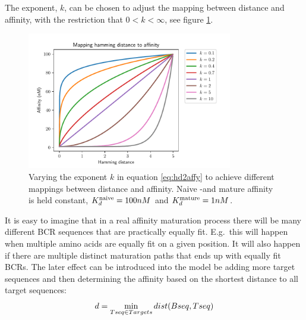 The exponent, $k$, can be chosen to adjust the mapping between distance and affinity, with the restriction that $0 < k < \infty$, see figure \ref{fig:hd2affy}.
\begin{figure}
    \centering
    \includegraphics[width=0.8\textwidth]{figures/hd2affy.pdf}
    \caption{
        \label{fig:hd2affy}
        Varying the exponent $k$ in equation \ref{eq:hd2affy} to achieve different mappings between distance and affinity. Naive -and mature affinity is held constant, $K^{\text{naive}}_d = 100nM$ and $K^{\text{mature}}_d = 1nM$.
    }
\end{figure}

It is easy to imagine that in a real affinity maturation process there will be many different BCR sequences that are practically equally fit.
E.g.\ this will happen when multiple amino acids are equally fit on a given position.
It will also happen if there are multiple distinct maturation paths that ends up with equally fit BCRs.
The later effect can be introduced into the model be adding more target sequences and then determining the affinity based on the shortest distance to all target sequences:
$$
d = \mathop{\mathrm{\min}}\limits_{Tseq \in Targets} dist(Bseq, Tseq)
$$






